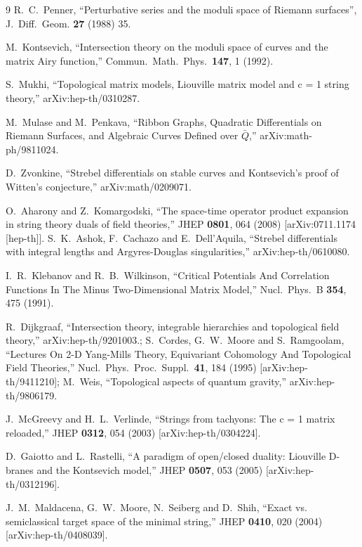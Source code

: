 \documentclass[11pt]{JHEP3}
\begin{document}
\begin{thebibliography}{9}
R.~C.~Penner, ``Perturbative series and the moduli space of Riemann surfaces'', J.~Diff.~Geom. {\bf 27} (1988) 35.
 
  M.~Kontsevich,
  ``Intersection theory on the moduli space of curves and the matrix Airy
  function,''
  Commun.\ Math.\ Phys.\  {\bf 147}, 1 (1992).

  S.~Mukhi,
  ``Topological matrix models, Liouville matrix model and c = 1 string
  theory,''
  arXiv:hep-th/0310287.  
  

M.~Mulase and M.~Penkava, ``Ribbon Graphs, Quadratic Differentials on Riemann Surfaces, and Algebraic Curves Defined over $\bar Q$,''
	arXiv:math-ph/9811024.
	
D.~Zvonkine, ``Strebel differentials on stable curves and Kontsevich's proof of Witten's conjecture,'' 	arXiv:math/0209071.


  O.~Aharony and Z.~Komargodski,
  ``The space-time operator product expansion in string theory duals of field
  theories,''
  JHEP {\bf 0801}, 064 (2008)
  [arXiv:0711.1174 [hep-th]].
  S.~K.~Ashok, F.~Cachazo and E.~Dell'Aquila,
  ``Strebel differentials with integral lengths and Argyres-Douglas
  singularities,''
  arXiv:hep-th/0610080.


  I.~R.~Klebanov and R.~B.~Wilkinson,
  ``Critical Potentials And Correlation Functions In The Minus Two-Dimensional
  Matrix Model,''
  Nucl.\ Phys.\  B {\bf 354}, 475 (1991).


  R.~Dijkgraaf,
  ``Intersection theory, integrable hierarchies and topological field theory,''
  arXiv:hep-th/9201003.;
  S.~Cordes, G.~W.~Moore and S.~Ramgoolam,
  ``Lectures On 2-D Yang-Mills Theory, Equivariant Cohomology And Topological
  Field Theories,''
  Nucl.\ Phys.\ Proc.\ Suppl.\  {\bf 41}, 184 (1995)
  [arXiv:hep-th/9411210]; M.~Weis,
  ``Topological aspects of quantum gravity,''
  arXiv:hep-th/9806179.

  J.~McGreevy and H.~L.~Verlinde,
  ``Strings from tachyons: The c = 1 matrix reloaded,''
  JHEP {\bf 0312}, 054 (2003)
  [arXiv:hep-th/0304224].

  D.~Gaiotto and L.~Rastelli,
  ``A paradigm of open/closed duality: Liouville D-branes and the  Kontsevich
  model,''
  JHEP {\bf 0507}, 053 (2005)
  [arXiv:hep-th/0312196].

  J.~M.~Maldacena, G.~W.~Moore, N.~Seiberg and D.~Shih,
  ``Exact vs. semiclassical target space of the minimal string,''
  JHEP {\bf 0410}, 020 (2004)
  [arXiv:hep-th/0408039].


\end{thebibliography}
\end{document}
